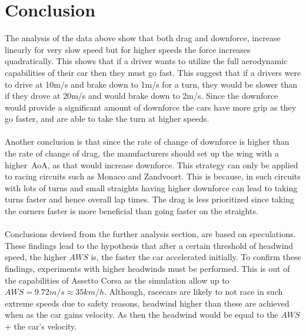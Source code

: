 \documentclass[11pt, a4paper]{article}
\begin{document}
\section{Conclusion}
The analysis of the data above show that both drag and downforce, increase linearly for very slow speed but for higher speeds the force increases quadratically. This shows that if a driver wants
to utilize the full aerodynamic capabilities of their car then they must go fast. This suggest that if a drivers were to drive at 10m/s and brake down to 1m/s for a turn, they would be slower than if they drove at 20m/s and would brake down to 2m/s. Since the downforce would 
provide a significant amount of downforce the cars have more grip as they go faster, and are able to take the turn at higher speeds.
\\\\
Another conclusion is that since the rate of change of downforce is higher than the rate of change of drag, the manufacturers should set up the wing with a higher~\gls{AoA}, as that would increase downforce.
This strategy can only be applied to racing circuits such as Monaco and Zandvoort. This is because, in such circuits with lots of turns and small straights having higher downforce can lead to taking turns faster and hence overall lap times. 
The drag is less prioritized since taking the corners faster is more beneficial than going faster on the straights.
\\\\
Conclusions devised from the further analysis section, are based on speculations. These findings lead to the hypothesis that after a certain threshold of headwind speed, the higher $AWS$ is, the faster the car accelerated initially.
To confirm these findings, experiments with higher headwinds must be performed. This is out of the capabilities of Assetto Corsa as the simulation allow up to $AWS=9.72m/s\approx35km/h$. Although, racecars are likely to not race in such extreme speeds
due to safety reasons, headwind higher than these are achieved when as the car gains velocity. As then the headwind would be equal to the $AWS$ + the car's velocity.
\end{document}
